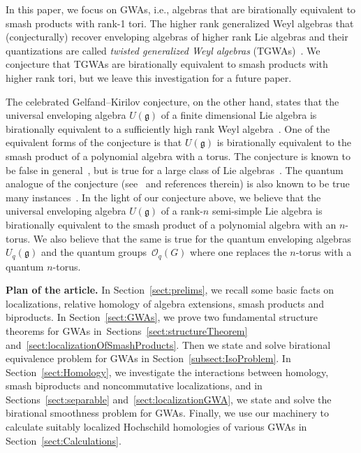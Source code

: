 \documentclass[pdftex]{sigma}
\newcommand{\G}[1]{\mathfrak{#1}}
\newcommand{\C}[1]{\mathcal{#1}}
\numberwithin{equation}{section}
\begin{document}
In this paper, we focus on GWAs, i.e., algebras that are birationally equivalent to smash products
with rank-1 tori. The higher rank generalized Weyl algebras that (conjecturally) recover enveloping
algebras of higher rank Lie algebras and their quantizations are called \emph{twisted generalized
 Weyl algebras} (TGWAs)~\cite{Hartwig:LocallyFiniteSimpleWeights,
 Hartwig:TGWAs, MPT03,MazorchukTurowska:TGWAs}. We conjecture that TGWAs are birationally equivalent to smash products with
higher rank tori, but we leave this investigation for a future paper.

The celebrated Gelfand--Kirilov conjecture, on the other hand, states that the universal enveloping
algebra $U(\G{g})$ of a finite dimensional Lie algebra is birationally equivalent to a sufficiently
high rank Weyl algebra~\cite{GelfandKirilov:Conjecture}. One of the equivalent forms of the
conjecture is that $U(\G{g})$ is birationally equivalent to the smash product of a polynomial
algebra with a torus. The conjecture is known to be false in general~\cite{AOV:CounterExamplesToGK,
 CKPR11}, but is true for a large class of Lie algebras~\cite{GelfandKirilov:Conjecture,
 Joseph:GKConjecture, Hai:GKConjecture}. The quantum analogue of the conjecture
(see~\cite[pp.~19--21 and Section~II.10.4]{BrownGoodearl:QuantumGroups} and references therein) is also
known to be true many instances~\cite{AlevDumas:QuantumGK, FutornyHartwig:QuantumGK}. In the light
of our conjecture above, we believe that the universal enveloping algebra $U(\G{g})$ of a rank-$n$
semi-simple Lie algebra is birationally equivalent to the smash product of a polynomial algebra with
an $n$-torus. We also believe that the same is true for the quantum enveloping algebras
$U_q(\G{g})$ and the quantum groups~$\C{O}_q(G)$ where one replaces the $n$-torus with a quantum
$n$-torus.

{\bf Plan of the article.}
In Section~\ref{sect:prelims}, we recall some basic facts on localizations, relative homology
of algebra extensions, smash products and biproducts. In Section~\ref{sect:GWAs}, we prove
two fundamental structure theorems for GWAs in~Sections~\ref{sect:structureTheorem}
and~\ref{sect:localizationOfSmashProducts}. Then we state and solve birational equivalence
problem for GWAs in Section~\ref{subsect:IsoProblem}. In Section~\ref{sect:Homology}, we
investigate the interactions between homology, smash biproducts and noncommutative
localizations, and in Sections~\ref{sect:separable} and~\ref{sect:localizationGWA}, we state
and solve the birational smoothness problem for GWAs. Finally, we use our machinery to
calculate suitably localized Hochschild homologies of various GWAs in
Section~\ref{sect:Calculations}.
\end{document}

